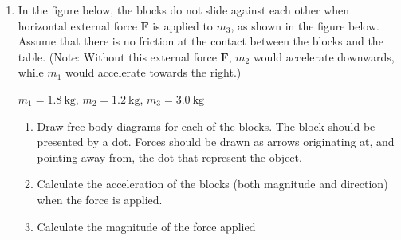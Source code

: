 \begin{enumerate}[itemsep=6pt]
\item In the figure below, the blocks do not slide against each other when
  horizontal external force $\bm F$ is applied to $m_3$, as shown in the
  figure below. Assume that there is no friction at the contact between the
  blocks and the table. (Note: Without this external force $\bm F$, $m_2$
  would accelerate downwards, while $m_1$ would accelerate towards the right.)
  \begin{center}
    
    $m_1=\SI{1.8}{\kilo\gram}$, $m_2=\SI{1.2}{\kilo\gram}$,
    $m_3=\SI{3.0}{\kilo\gram}$
  \end{center}    
  \begin{enumerate}[itemsep=3pt]
  \item Draw free-body diagrams for each of the blocks. The block should be
    presented by a dot. Forces should be drawn as arrows originating at, and
    pointing away from, the dot that represent the object.
      
  \item Calculate the acceleration of the blocks (both magnitude and
    direction) when the force is applied.
  \item Calculate the magnitude of the force applied
  \end{enumerate}
    

\end{enumerate}
